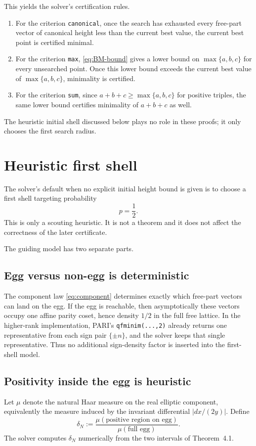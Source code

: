 \documentclass[11pt]{article}
\begin{document}
This yields the solver's certification rules.

\begin{enumerate}[label=\arabic*.]
\item For the criterion \texttt{canonical}, once the search has exhausted every free-part vector of canonical height less than the current best value, the current best point is certified minimal.
\item For the criterion \texttt{max}, \eqref{eq:BM-bound} gives a lower bound on $\max\{a,b,c\}$ for every unsearched point. Once this lower bound exceeds the current best value of $\max\{a,b,c\}$, minimality is certified.
\item For the criterion \texttt{sum}, since $a+b+c\ge \max\{a,b,c\}$ for positive triples, the same lower bound certifies minimality of $a+b+c$ as well.
\end{enumerate}

The heuristic initial shell discussed below plays no role in these proofs; it only chooses the first search radius.

\section{Heuristic first shell}
The solver's default when no explicit initial height bound is given is to choose a first shell targeting probability
\[
p=\frac12.
\]
This is only a scouting heuristic. It is not a theorem and it does not affect the correctness of the later certificate.

The guiding model has two separate parts.

\subsection*{Egg versus non-egg is deterministic}
The component law \eqref{eq:component} determines exactly which free-part vectors can land on the egg. If the egg is reachable, then asymptotically these vectors occupy one affine parity coset, hence density $1/2$ in the full free lattice. In the higher-rank implementation, PARI's \texttt{qfminim(...,2)} already returns one representative from each sign pair $\{\pm n\}$, and the solver keeps that single representative. Thus no additional sign-density factor is inserted into the first-shell model.

\subsection*{Positivity inside the egg is heuristic}
Let $\mu$ denote the natural Haar measure on the real elliptic component, equivalently the measure induced by the invariant differential $|dx/(2y)|$. Define
\[
\delta_N := \frac{\mu(\text{positive region on egg})}{\mu(\text{full egg})}.
\]
The solver computes $\delta_N$ numerically from the two intervals of Theorem~4.1.
\end{document}
